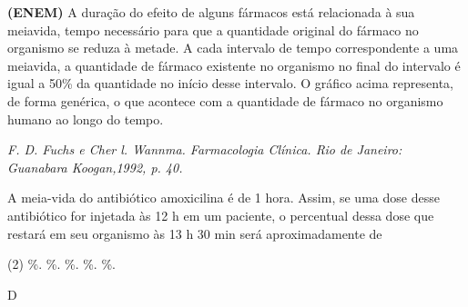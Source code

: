 \documentclass[9 pt]{scrartcl}
\def\PQ{0.84} %
\begin{document}
\begin{exercise}[points=\PQ]
\textbf{(ENEM)} A duração do efeito de alguns fármacos está relacionada à sua meiavida, tempo necessário para que a quantidade original do fármaco no organismo se reduza à metade. A cada intervalo de tempo correspondente a uma meiavida, a quantidade de fármaco existente no organismo no final do intervalo é igual a 50\% da quantidade no início desse intervalo.
O gráfico acima representa, de forma genérica, o que acontece com a quantidade de fármaco no organismo humano ao longo do tempo.

\emph{ {\scriptsize F. D. Fuchs e Cher l. Wannma. Farmacologia Clínica. Rio de Janeiro: Guanabara Koogan,1992, p. 40.}}

\begin{center}
\end{center}

A meia-vida do antibiótico amoxicilina é de 1 hora. Assim, se uma dose desse antibiótico for injetada às 12 h em um paciente, o percentual dessa dose que restará em seu organismo às 13 h 30 min será aproximadamente de

\begin{choice}(2)
\%.
\%.
\%.
\%.
\%.
\end{choice}
\end{exercise}
\begin{solution}
D
\end{solution}














\end{document}
